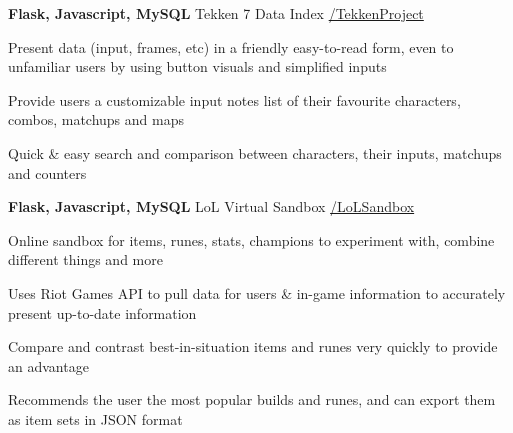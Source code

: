 
\begin{cventries}

  \cventry
    {\textbf{Flask, Javascript, MySQL}} %
    {Tekken 7 Data Index} %
    {\href{https://github.com/basulaib/TekkenProject}{\faGithub /TekkenProject}} %
    {} %
    {
      \begin{cvitems} %
        \item {Present data (input, frames, etc) in a friendly easy-to-read form, even to unfamiliar users by using button visuals and simplified inputs}
        \item {Provide users a customizable input notes list of their favourite characters, combos, matchups and maps}
        \item {Quick \& easy search and comparison between characters, their inputs, matchups and counters}
      \end{cvitems}
    }
    
  \cventry
    {\textbf{Flask, Javascript, MySQL}} %
    {LoL Virtual Sandbox} %
    {\href{https://github.com/basulaib/LoLSandbox}{\faGithub /LoLSandbox}} %
    {} %
    {
      \begin{cvitems} %
        \item {Online sandbox for items, runes, stats, champions to experiment with, combine different things and more}
        \item {Uses Riot Games API to pull data for users \& in-game information to accurately present up-to-date information}
        \item {Compare and contrast best-in-situation items and runes very quickly to provide an advantage}
        \item {Recommends the user the most popular builds and runes, and can export them as item sets in JSON format}
      \end{cvitems}
    }


\end{cventries}
